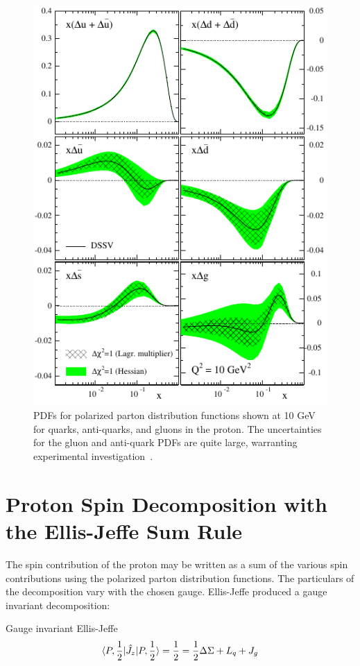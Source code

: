 \begin{figure}[ht]
  \centering
  \includegraphics[width=0.8\linewidth]{./figures/polarized_pdfs_dssv.pdf}
  \caption{
    PDFs for polarized parton distribution functions shown at 10 GeV for quarks,
    anti-quarks, and gluons in the proton. The uncertainties for the gluon and
    anti-quark PDFs are quite large, warranting experimental
    investigation~\cite{DeFlorian2009}.
  }
  \label{fig:polarized_pdfs_2}
\end{figure}

\clearpage
\section{Proton Spin Decomposition with the Ellis-Jeffe Sum Rule }

The spin contribution of the proton may be written as a sum of the various
spin contributions using the polarized parton distribution functions. The
particulars of the decomposition vary with the chosen gauge. Ellis-Jeffe
produced a gauge invariant decomposition:

{\noindent}Gauge invariant Ellis-Jeffe
\begin{equation}
  \braket{P,{1\over2}|\hat{J_z}|P,{1\over2}}  
 = {1\over2} = {{1\over2}\Delta \Sigma +L_q+J_g}
\label{eq:ellis_jeffe_sum}
\end{equation}


